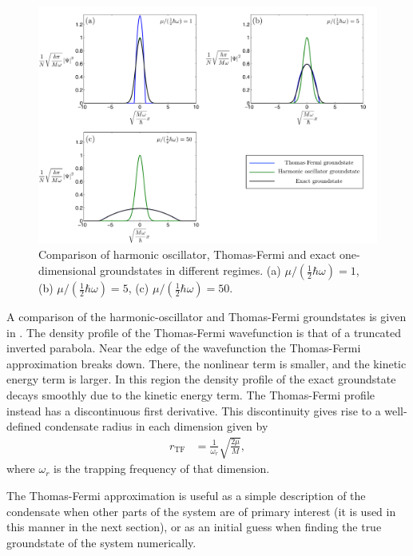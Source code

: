 \begin{figure}
    \centering
    \includegraphics[width=14cm]{GroundStateComparison}
    \caption{Comparison of harmonic oscillator, Thomas-Fermi and exact one-dimensional groundstates in different regimes.  (a) $\mu / (\frac{1}{2} \hbar \omega) = 1$, (b) $\mu / (\frac{1}{2} \hbar \omega) = 5$, (c) $\mu / (\frac{1}{2} \hbar \omega) = 50$.}
    \label{BackgroundTheory:GroundStateComparison}
\end{figure}

A comparison of the harmonic-oscillator and Thomas-Fermi groundstates is given in .  The density profile of the Thomas-Fermi wavefunction is that of a truncated inverted parabola.  Near the edge of the wavefunction the Thomas-Fermi approximation breaks down.  There, the nonlinear term is smaller, and the kinetic energy term is larger.  In this region the density profile of the exact groundstate decays smoothly due to the kinetic energy term.  The Thomas-Fermi profile instead has a discontinuous first derivative.  This discontinuity gives rise to a well-defined condensate radius in each dimension given by
\begin{align}
    r_\text{TF} &= \frac{1}{\omega_r} \sqrt{\frac{2 \mu}{M}},
\end{align}
where $\omega_r$ is the trapping frequency of that dimension.

The Thomas-Fermi approximation is useful as a simple description of the condensate when other parts of the system are of primary interest (it is used in this manner in the next section), or as an initial guess when finding the true groundstate of the system numerically.

